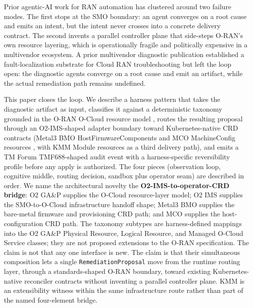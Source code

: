 \documentclass[twocolumn,10pt,a4paper]{article}
\begin{document}
Prior agentic-AI work for RAN automation has clustered around two failure modes. The first stops at the SMO boundary: an agent converges on a root cause and emits an intent, but the intent never crosses into a concrete delivery contract. The second invents a parallel controller plane that side-steps O-RAN's own resource layering, which is operationally fragile and politically expensive in a multivendor ecosystem. A prior multivendor diagnostic publication established a fault-localization substrate for Cloud RAN troubleshooting \cite{multivendor_blog_2026} but left the loop open: the diagnostic agents converge on a root cause and emit an artifact, while the actual remediation path remains undefined.

This paper closes the loop. We describe a harness pattern that takes the diagnostic artifact as input, classifies it against a deterministic taxonomy grounded in the O-RAN O-Cloud resource model \cite{oran_wg1_arch,oran_o2_ganp}, routes the resulting proposal through an O2-IMS-shaped adapter boundary \cite{oran_o2_ims} toward Kubernetes-native CRD contracts (Metal3 BMO HostFirmwareComponents \cite{metal3_bmo} and MCO MachineConfig resources \cite{openshift_mco}, with KMM Module resources \cite{kmm_operator} as a third delivery path), and emits a TM Forum TMF688-shaped audit event \cite{tmf688} with a harness-specific reversibility profile before any apply is authorized. The four pieces (observation loop, cognitive middle, routing decision, sandbox plus operator seam) are described in order. We name the architectural novelty the \textbf{O2-IMS-to-operator-CRD bridge}: O2 GA\&P \cite{oran_o2_ganp} supplies the O-Cloud resource-layer model; O2 IMS \cite{oran_o2_ims} supplies the SMO-to-O-Cloud infrastructure handoff shape; Metal3 BMO \cite{metal3_bmo} supplies the bare-metal firmware and provisioning CRD path; and MCO \cite{openshift_mco} supplies the host-configuration CRD path. The taxonomy subtypes are harness-defined mappings into the O2 GA\&P Physical Resource, Logical Resource, and Managed O-Cloud Service classes; they are not proposed extensions to the O-RAN specification. The claim is not that any one interface is new. The claim is that their simultaneous composition lets a single \texttt{RemediationProposal} move from the runtime routing layer, through a standards-shaped O-RAN boundary, toward existing Kubernetes-native reconciler contracts without inventing a parallel controller plane. KMM is an extensibility witness within the same infrastructure route rather than part of the named four-element bridge.
\end{document}
